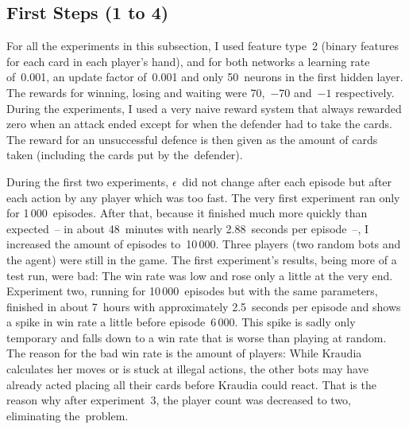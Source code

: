 \documentclass[a4paper,titlepage]{article}
\begin{document}
\subsection{First Steps (1 to 4)}

For all the experiments in this subsection, I used feature type~2 (binary features for each card in each player's hand), and for both networks a learning rate of~0.001, an update factor of~0.001 and only 50~neurons in the first hidden layer. The rewards for winning, losing and waiting were 70,~$-70$ and~$-1$ respectively. During the experiments, I used a very naive reward system that always rewarded zero when an attack ended except for when the defender had to take the cards. The reward for an unsuccessful defence is then given as the amount of cards taken (including the cards put by the~defender).

During the first two experiments, $\epsilon$~did not change after each episode but after each action by any player which was too fast.
The very first experiment ran only for 1\,000~episodes. After that, because it finished much more quickly than expected~-- in about 48~minutes with nearly 2.88~seconds per episode~--, I increased the amount of episodes to~10\,000.
Three players (two random bots and the agent) were still in the game. The first experiment's results, being more of a test run, were bad: The win rate was low and rose only a little at the very end. Experiment two, running for 10\,000~episodes but with the same parameters, finished in about 7~hours with approximately 2.5~seconds per episode and shows a spike in win rate a little before episode~6\,000. This spike is sadly only temporary and falls down to a win rate that is worse than playing at random. The reason for the bad win rate is the amount of players: While Kraudia calculates her moves or is stuck at illegal actions, the other bots may have already acted placing all their cards before Kraudia could react. That is the reason why after experiment~3, the player count was decreased to two, eliminating the~problem.
\end{document}
